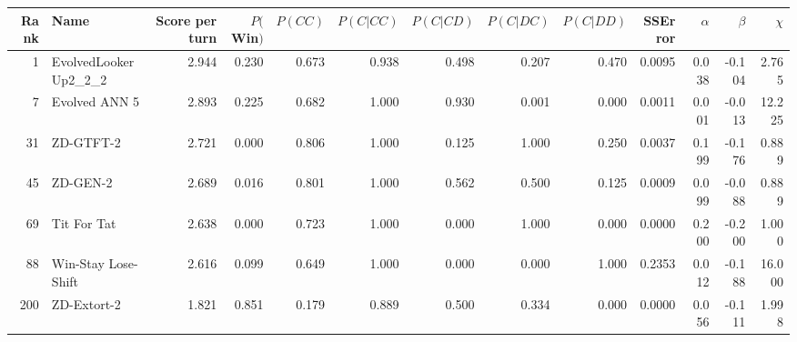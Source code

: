 \begin{tabular}{rlrrrrrrrrrrr}
\toprule
 Rank &                  Name &  Score per turn &  $P($Win$)$ &  $P(CC)$ &  $P(C|CC)$ &  $P(C|CD)$ &  $P(C|DC)$ &  $P(C|DD)$ &  SSError &  $\alpha$ &  $\beta$ &  $\chi$ \\
\midrule
    1 &  EvolvedLookerUp2\_2\_2 &           2.944 &       0.230 &    0.673 &      0.938 &      0.498 &      0.207 &      0.470 &   0.0095 &     0.038 &   -0.104 &   2.765 \\
    7 &         Evolved ANN 5 &           2.893 &       0.225 &    0.682 &      1.000 &      0.930 &      0.001 &      0.000 &   0.0011 &     0.001 &   -0.013 &  12.225 \\
   31 &             ZD-GTFT-2 &           2.721 &       0.000 &    0.806 &      1.000 &      0.125 &      1.000 &      0.250 &   0.0037 &     0.199 &   -0.176 &   0.889 \\
   45 &              ZD-GEN-2 &           2.689 &       0.016 &    0.801 &      1.000 &      0.562 &      0.500 &      0.125 &   0.0009 &     0.099 &   -0.088 &   0.889 \\
   69 &           Tit For Tat &           2.638 &       0.000 &    0.723 &      1.000 &      0.000 &      1.000 &      0.000 &   0.0000 &     0.200 &   -0.200 &   1.000 \\
   88 &   Win-Stay Lose-Shift &           2.616 &       0.099 &    0.649 &      1.000 &      0.000 &      0.000 &      1.000 &   0.2353 &     0.012 &   -0.188 &  16.000 \\
  200 &           ZD-Extort-2 &           1.821 &       0.851 &    0.179 &      0.889 &      0.500 &      0.334 &      0.000 &   0.0000 &     0.056 &   -0.111 &   1.998 \\
\bottomrule
\end{tabular}

